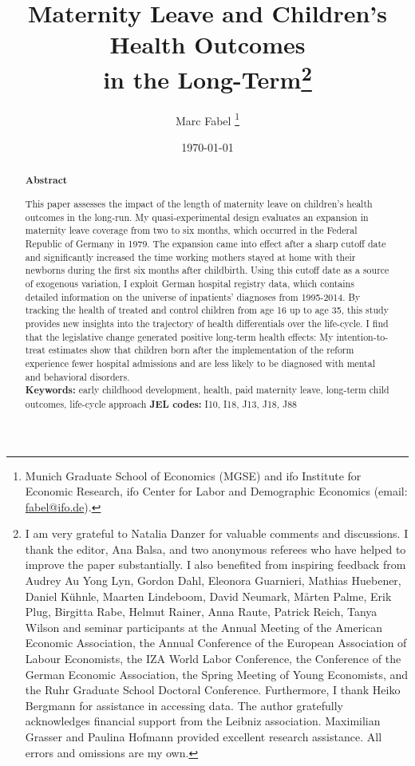 \documentclass[11pt, a4paper]{article} %
\title{Maternity Leave and Children's Health Outcomes\\ in the Long-Term\footnote{I am very grateful to Natalia Danzer for valuable comments and discussions. I thank the editor, Ana Balsa, and two anonymous referees who have helped to improve the paper substantially. I also benefited from inspiring feedback from Audrey Au Yong Lyn, Gordon Dahl, Eleonora Guarnieri, Mathias Huebener, Daniel Kühnle, Maarten Lindeboom, David Neumark, Mårten Palme, Erik Plug, Birgitta Rabe, Helmut Rainer, Anna Raute, Patrick Reich, Tanya Wilson and seminar participants at the Annual Meeting of the American Economic Association, the Annual Conference of the European Association of Labour Economists, the IZA World Labor Conference, the Conference of the German Economic Association, the Spring Meeting of Young Economists, and the Ruhr Graduate School Doctoral Conference. Furthermore, I thank Heiko Bergmann for assistance in accessing data. The author gratefully acknowledges financial support from the Leibniz association. Maximilian Grasser and Paulina Hofmann provided excellent research assistance. All errors and omissions are my own.
}}
\author{
	Marc Fabel 
		\thanks{Munich Graduate School of Economics (MGSE) and ifo Institute for Economic Research, ifo Center for Labor and Demographic Economics (email: \href{mailto:fabel@ifo.de}{fabel@ifo.de}).
		}
}
\date{\monthyeardate\today}
\begin{document}
	
	
\renewcommand\thesection{0}
\renewcommand\thefigure{R.\arabic{figure}}
\setcounter{figure}{0} 
\captionsetup[subfigure]{labelformat=parens}
\renewcommand\thetable{R.\arabic{table}}
\setcounter{table}{0} 
\renewcommand\theequation{R.\arabic{equation}}
\setcounter{equation}{0} 	
	
	
	
	
	
		



\renewcommand\thesection{\arabic{section}}
\setcounter{section}{0} 
\renewcommand\thefigure{\arabic{figure}}
\setcounter{figure}{0} 
\captionsetup[subfigure]{labelformat=parens}
\renewcommand\thetable{\arabic{table}}
\setcounter{table}{0}
\renewcommand\theequation{\arabic{equation}}
\setcounter{equation}{0}  



\clearpage
\setcounter{page}{0}    
\maketitle

\renewcommand{\abstractname}{\vspace{-\baselineskip}} %

  \begin{abstract}\noindent 
   \footnotesize{\begin{center}\textbf{Abstract}\end{center} This paper assesses the impact of the length of maternity leave on children’s health outcomes in the long-run. My quasi-experimental design evaluates an expansion in maternity leave coverage from two to six months, which occurred in the Federal Republic of Germany in 1979. The expansion came into effect after a sharp cutoff date and significantly increased the time working mothers stayed at home with their newborns during the first six months after childbirth. Using this cutoff date as a source of exogenous variation, I exploit German hospital registry data, which contains detailed information on the universe of inpatients' diagnoses from 1995-2014. 
   By tracking the health of treated and control children from age 16 up to age 35, this study provides new insights into the trajectory of health differentials over the life-cycle. I find that the legislative change generated positive long-term health effects: My intention-to-treat estimates show that children born after the implementation of the reform experience fewer hospital admissions and are less likely to be diagnosed with mental and behavioral disorders.
   	\\\newline \textbf{Keywords:} early childhood development, health, paid maternity leave, long-term child outcomes, life-cycle approach \newline \textbf{JEL codes:} I10, I18, J13, J18, J88}
    \end{abstract}
\end{document}
